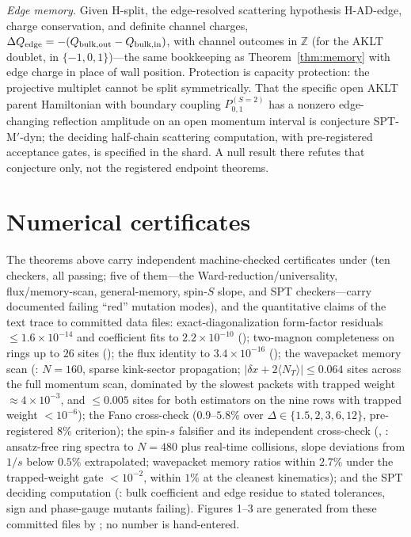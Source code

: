 \documentclass[aps,prl,twocolumn,superscriptaddress,longbibliography,floatfix]{revtex4-2}
\begin{document}
\emph{Edge memory.} Given H-split, the edge-resolved scattering
hypothesis H-AD-edge, charge
conservation, and definite channel charges,
$\Delta Q_{\rm edge}=-(Q_{\rm bulk,out}-Q_{\rm bulk,in})$, with channel
outcomes in $\mathbb{Z}$ (for the AKLT doublet, in $\{-1,0,1\}$)---the
same bookkeeping as Theorem~\ref{thm:memory} with edge charge in place of
wall position. Protection is capacity protection: the projective multiplet
cannot be split symmetrically. That the specific open AKLT parent
Hamiltonian with boundary coupling $P^{(S=2)}_{0,1}$ has a nonzero
edge-changing reflection amplitude on an open momentum interval is
conjecture SPT-M$'$-dyn; the deciding half-chain scattering computation,
with pre-registered acceptance gates, is specified in the shard. A null
result there refutes that conjecture only, not the registered endpoint
theorems.

\section{Numerical certificates}\label{app:numerics}

\begingroup\raggedright
The theorems above carry independent machine-checked certificates
under  (ten checkers, all passing; five of
them---the Ward-reduction/universality, flux/memory-scan, general-memory,
spin-$S$ slope, and SPT checkers---carry documented failing ``red''
mutation modes), and the quantitative claims of the
text trace to committed data files: exact-diagonalization form-factor
residuals $\le1.6\times10^{-14}$ and coefficient fits to
$2.2\times10^{-10}$ (); two-magnon
completeness on rings up to $26$ sites
(); the flux identity to
$3.4\times10^{-16}$ (); the wavepacket memory scan
(: $N=160$, sparse kink-sector propagation;
$|\delta x+2\langle N_T\rangle|\le0.064$ sites across the full momentum
scan, dominated by the slowest packets with trapped weight
${\approx}4\times10^{-3}$, and $\le0.005$ sites for both estimators on the
nine rows with trapped weight $<10^{-6}$);
the Fano cross-check ($0.9$--$5.8\%$ over
$\Delta\in\{1.5,2,3,6,12\}$, pre-registered $8\%$ criterion); the spin-$s$
falsifier and its independent cross-check
(, :
ansatz-free ring spectra to $N=480$ plus real-time collisions, slope
deviations from $1/s$ below $0.5\%$ extrapolated; wavepacket memory ratios
within $2.7\%$ under the trapped-weight gate $<10^{-2}$, within $1\%$ at
the cleanest kinematics); and the SPT deciding computation
(: bulk coefficient and edge residue to
stated tolerances, sign and phase-gauge mutants failing). Figures 1--3 are
generated from these committed files by
; no number is hand-entered.
\par\endgroup


\end{document}
